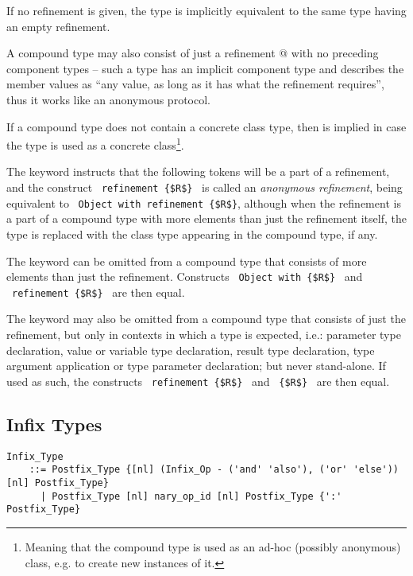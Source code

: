 If no refinement is given, the type is implicitly equivalent to the same type having an empty refinement. 

A compound type may also consist of just a refinement @ with no preceding component types -- such a type has an implicit component type  and describes the member values as ``any value, as long as it has what the refinement requires'', thus it works like an anonymous protocol. 

If a compound type does not contain a concrete class type, then  is implied in case the type is used as a concrete class\footnote{Meaning that the compound type is used as an ad-hoc (possibly anonymous) class, e.g. to create new instances of it.}.

The keyword  instructs that the following tokens will be a part of a refinement, and the construct ~\lstinline!refinement {$R$}!~ is called an {\em anonymous refinement}, being equivalent to ~\lstinline!Object with refinement {$R$}!, although when the refinement is a part of a compound type with more elements than just the refinement itself, the  type is replaced with the class type appearing in the compound type, if any. 

The  keyword can be omitted from a compound type that consists of more elements than just the refinement. Constructs ~\lstinline!Object with {$R$}!~ and ~\lstinline!refinement {$R$}!~ are then equal. 

The  keyword may also be omitted from a compound type that consists of just the refinement, but only in contexts in which a type is expected, i.e.: parameter type declaration, value or variable type declaration, result type declaration, type argument application or type parameter declaration; but never stand-alone. If used as such, the constructs ~\lstinline!refinement {$R$}!~ and ~\lstinline!{$R$}!~ are then equal. 





\subsection{Infix Types}
\label{sec:infix-types}

\grammar\begin{lstlisting}
Infix_Type 
    ::= Postfix_Type {[nl] (Infix_Op - ('and' 'also'), ('or' 'else')) [nl] Postfix_Type}
      | Postfix_Type [nl] nary_op_id [nl] Postfix_Type {':' Postfix_Type}
\end{lstlisting}

